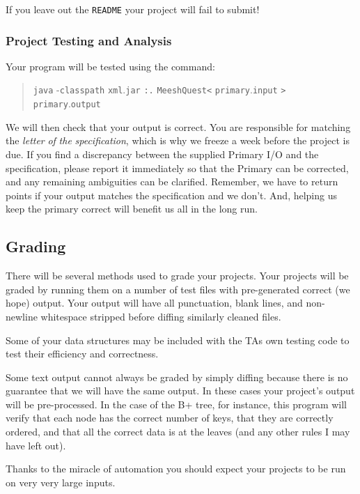 \documentclass[12pt]{article}
\begin{document}
If you leave out the \texttt{README} your project will fail to submit!

\subsubsection{Project Testing and Analysis}

Your program will be tested using the command:
\begin{quote}
\texttt{java} -\texttt{classpath} \texttt{xml}.\texttt{jar} \texttt{:.} \texttt{MeeshQuest}\texttt{<}
\texttt{primary}.\texttt{input} \texttt{>} \texttt{primary}.\texttt{output}
\end{quote}

We will then check that your output is correct.
You are responsible for matching the \emph{letter} \emph{of}
\emph{the} \emph{specification}, which is why we freeze a week before
the project is due. If you find a discrepancy between the supplied
Primary I/O and the specification, please report it immediately so
that the Primary can be corrected, and any remaining ambiguities can
be clarified. Remember, we have to return points if your output
matches the specification and we don't. And, helping us keep the
primary correct will benefit us all in the long run.



\subsection{Grading}

There will be several methods used  to grade your projects.  Your projects
will be graded by running them on a number of test files with
pre-generated correct
 (we hope) output.  Your output will
have all punctuation, blank lines, and non-newline whitespace stripped
before diffing similarly cleaned files.


Some of your data structures may be included with the TAs own testing
code to test their efficiency and correctness.

Some text output cannot always be graded by simply diffing because
there is no guarantee that we will have the same output.  In these
cases your project's output will be pre-processed.  In the case of the
B+  tree, for instance, this program will verify that each node has the
correct number of keys, that they are correctly ordered, and that all
the correct data is at the leaves (and any other rules I may have left
out).

Thanks to the miracle of automation you should expect your projects to
be run on very very large inputs.
\end{document}

